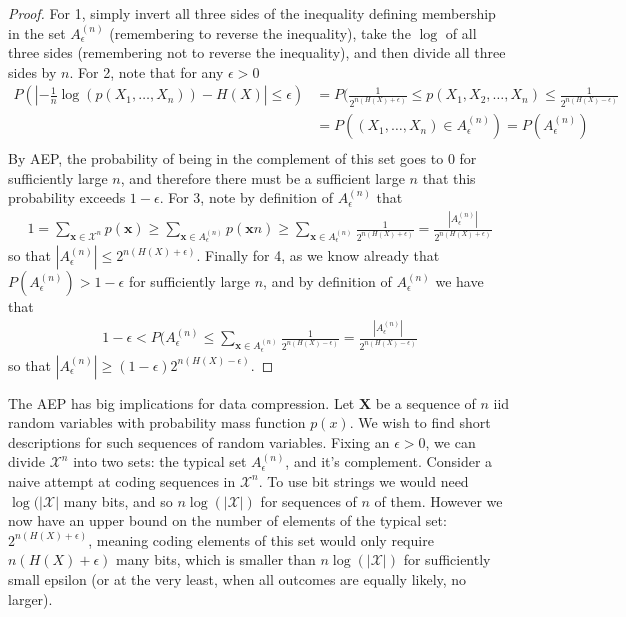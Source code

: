 \documentclass{article}
\theoremstyle{definition}
\theoremstyle{plain}
\begin{document}
\begin{proof}
	For 1, simply invert all three sides of the inequality defining membership in the set $A^{(n)}_{\epsilon}$ (remembering to reverse the inequality), take the $\log$ of all three sides (remembering not to reverse the inequality), and then divide all three sides by $n$. For 2, note that for any $\epsilon > 0$
	\begin{align}
		P(|-\frac{1}{n}\log(p(X_1,\ldots,X_n)) - H(X)| \leq \epsilon) &= P(\frac{1}{2^{n(H(X)+\epsilon)}} \leq p(X_1,X_2,\ldots,X_n) \leq \frac{1}{2^{n(H(X)-\epsilon)}} \\
		&= P((X_1,\ldots,X_n) \in A^{(n)}_{\epsilon}) = P(A^{(n)}_{\epsilon}) \\
	\end{align}
	By AEP, the probability of being in the complement of this set goes to $0$ for sufficiently large $n$, and therefore there must be a sufficient large $n$ that this probability exceeds $1-\epsilon$. For 3, note by definition of $A^{(n)}_{\epsilon}$ that 
	\begin{align}
		1 = \sum_{\bm{x} \in \mathcal{X}^n} p(\bm{x}) \geq \sum_{\bm{x} \in A^{(n)}_{\epsilon}} p(\bm{x}n) \geq \sum_{\bm{x} \in A^{(n)}_{\epsilon}} \frac{1}{2^{n(H(X)+\epsilon)}} = \frac{|A^{(n)}_{\epsilon}|}{2^{n(H(X)+\epsilon)}}
	\end{align}
	so that $|A^{(n)}_{\epsilon}| \leq 2^{n(H(X)+\epsilon)}$. Finally for 4, as we know already that $P(A_{\epsilon}^{(n)}) > 1-\epsilon$ for sufficiently large $n$, and by definition of  $A_{\epsilon}^{(n)}$ we have that
	\begin{align}
		1-\epsilon < P(A^{(n)}_{\epsilon}  \leq \sum_{\bm{x} \in A^{(n)}_{\epsilon}} \frac{1}{2^{n(H(X)-\epsilon)}} = \frac{|A^{(n)}_{\epsilon}|}{2^{n(H(X)-\epsilon)}}
	\end{align}
so that $|A^{(n)}_{\epsilon}| \geq (1-\epsilon)2^{n(H(X)-\epsilon)}$.
\end{proof}
The AEP has big implications for data compression. Let $\bm{X}$ be a sequence of $n$ iid random variables with probability mass function $p(x)$. We wish to find short descriptions for such sequences of random variables. Fixing an $\epsilon > 0$, we can divide $\mathcal{X}^n$ into two sets: the typical set $A^{(n)}_{\epsilon}$, and it's complement. Consider a naive attempt at coding sequences in $\mathcal{X}^n$. To use bit strings we would need $\log(|\mathcal{X}|$ many bits, and so $n\log(|\mathcal{X}|)$ for sequences of $n$ of them. However we now have an upper bound on the number of elements of the typical set: $2^{n(H(X)+\epsilon)}$, meaning coding elements of this set would only require $n(H(X)+\epsilon)$ many bits, which is smaller than $n\log(|\mathcal{X}|)$ for sufficiently small epsilon (or at the very least, when all outcomes are equally likely, no larger). \par 
\end{document}
